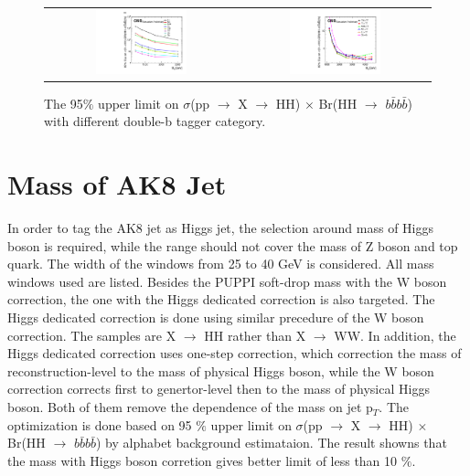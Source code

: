 \begin{figure}[t]
  \centering
  \begin{tabular}{cc}
    \includegraphics[width=0.5\textwidth]{Figures/BDTLimit.pdf} &
    \includegraphics[width=0.5\textwidth]{Figures/BDTLimitcombine.pdf}
  \end{tabular}
  \caption{The 95$\% $ upper limit on $\sigma$(pp $\rightarrow$ X $\rightarrow$ HH) $\times$ Br(HH $\rightarrow$ $b\bar{b}b\bar{b}$) with different double-b tagger category.}
  \label{fig:hvt_brs}
\end{figure}

\clearpage
\section{Mass of AK8 Jet}
In order to tag the AK8 jet as Higgs jet, the selection around mass of Higgs boson is required, while the range should not cover the mass of Z boson and top quark. The width of the windows from 25 to 40 GeV is considered. All mass windows used are listed. Besides the PUPPI soft-drop mass with the W boson correction, the one with the Higgs dedicated correction is also targeted. The Higgs dedicated correction is done using similar precedure of the W boson correction. The samples are X $\rightarrow$ HH rather than X $\rightarrow$ WW. In addition, the Higgs dedicated correction uses one-step correction, which correction the mass of reconstruction-level to the mass of physical Higgs boson, while the W boson correction corrects first to genertor-level then to the mass of physical Higgs boson. Both of them remove the dependence of the mass on jet p$_{T}$. The optimization is done based on 95 $\% $ upper limit on $\sigma$(pp $\rightarrow$ X $\rightarrow$ HH) $\times$ Br(HH $\rightarrow$ $b\bar{b}b\bar{b}$) by alphabet background estimataion. The result showns that the mass with Higgs boson corretion gives better limit of less than 10 $\% $.

